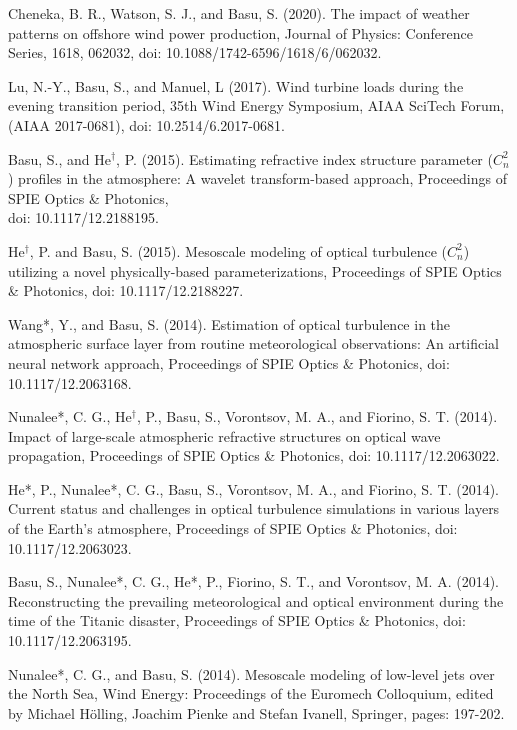 \begin{etaremune}[topsep=0pt,itemsep=0pt,partopsep=0pt,parsep=0pt]
\item Cheneka, B. R., Watson, S. J., and Basu, S. (2020). The impact of weather patterns on offshore wind power production, Journal of Physics: Conference Series, 1618, 062032, doi: 10.1088/1742-6596/1618/6/062032.

\item Lu, N.-Y., Basu, S., and Manuel, L (2017). Wind turbine loads during the evening transition period, 35th Wind Energy Symposium, AIAA SciTech Forum, (AIAA 2017-0681), doi: 10.2514/6.2017-0681.

\item Basu, S., and He$^{\dagger}$, P. (2015). Estimating refractive index structure parameter ($C_n^2$) profiles in the atmosphere: A wavelet transform-based approach, Proceedings of SPIE Optics \& Photonics,\\ doi: 10.1117/12.2188195.

\item He$^{\dagger}$, P. and Basu, S. (2015). Mesoscale modeling of optical turbulence ($C_n^2$) utilizing a novel physically-based parameterizations, Proceedings of SPIE Optics \& Photonics, doi: 10.1117/12.2188227.  

\item Wang*, Y., and Basu, S. (2014). Estimation of optical turbulence in the atmospheric surface layer from routine meteorological observations: An artificial neural network approach, Proceedings of SPIE Optics \& Photonics, doi: 10.1117/12.2063168. 

\item Nunalee*, C. G., He$^{\dagger}$, P., Basu, S., Vorontsov, M. A., and Fiorino, S. T. (2014). Impact of large-scale atmospheric refractive structures on optical wave propagation, Proceedings of SPIE Optics \& Photonics, doi: 10.1117/12.2063022. 

\item He*, P., Nunalee*, C. G., Basu, S., Vorontsov, M. A., and Fiorino, S. T. (2014). Current status and challenges in optical turbulence simulations in various layers of the Earth’s atmosphere, Proceedings of SPIE Optics \& Photonics, doi: 10.1117/12.2063023.

\item Basu, S., Nunalee*, C. G., He*, P., Fiorino, S. T., and Vorontsov, M. A. (2014). Reconstructing the prevailing meteorological and optical environment during the time of the Titanic disaster, Proceedings of SPIE Optics \& Photonics, doi: 10.1117/12.2063195. 

\item Nunalee*, C. G., and Basu, S. (2014). Mesoscale modeling of low-level jets over the North Sea, Wind Energy: Proceedings of the Euromech Colloquium, edited by Michael Hölling, Joachim Pienke and Stefan Ivanell, Springer, pages: 197-202. 


\end{etaremune}
